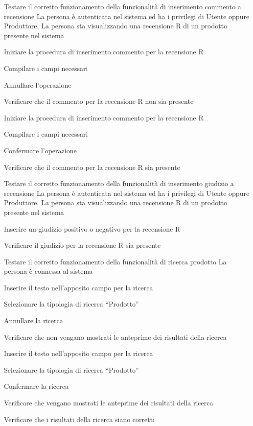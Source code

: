 
{Testare il corretto funzionamento della funzionalità di inserimento commento a recensione}
{La persona è autenticata nel sistema ed ha i privilegi di Utente oppure Produttore. La persona sta visualizzando una recensione R di un prodotto presente nel sistema}
{\begin{enumCU}
	\item Iniziare la procedura di inserimento commento per la recensione R
	\item Compilare i campi necessari
	\item Annullare l'operazione 
	\item Verificare che il commento per la recensione R non sia presente
	\item Iniziare la procedura di inserimento commento per la recensione R
	\item Compilare i campi necessari
	\item Confermare l'operazione 
	\item Verificare che il commento per la recensione R sia presente
\end{enumCU}}


{Testare il corretto funzionamento della funzionalità di inserimento giudizio a recensione}
{La persona è autenticata nel sistema ed ha i privilegi di Utente oppure Produttore. La persona sta visualizzando una recensione R di un prodotto presente nel sistema}
{\begin{enumCU}
	\item Inserire un giudizio positivo o negativo per la recensione R
	\item Verificare il giudizio per la recensione R sia presente
\end{enumCU}}


{Testare il corretto funzionamento della funzionalità di ricerca prodotto}
{La persona è connessa al sistema}
{\begin{enumCU}
	\item Inserire il testo nell'apposito campo per la ricerca
	\item Selezionare la tipologia di ricerca ``Prodotto''
	\item Annullare la ricerca
	\item Verificare che non vengano mostrati le anteprime dei risultati della ricerca
	\item Inserire il testo nell'apposito campo per la ricerca
	\item Selezionare la tipologia di ricerca ``Prodotto''
	\item Confermare la ricerca
	\item Verificare che vengano mostrati le anteprime dei risultati della ricerca
	\item Verificare che i risultati della ricerca siano corretti
\end{enumCU}}

